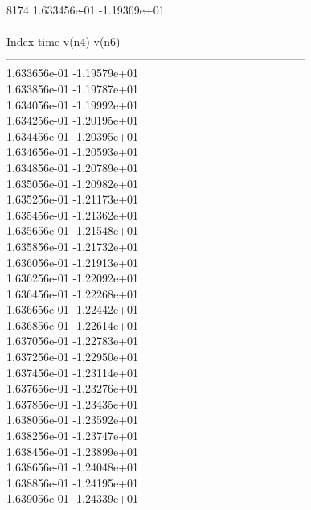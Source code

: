 8174	1.633456e-01	-1.19369e+01	\\ \hline
\\ \hline
Index   time            v(n4)-v(n6)     \\ \hline
--------------------------------------------------------------------------------\\ 	1.633656e-01	-1.19579e+01	\\ 	1.633856e-01	-1.19787e+01	\\ 	1.634056e-01	-1.19992e+01	\\ 	1.634256e-01	-1.20195e+01	\\ 	1.634456e-01	-1.20395e+01	\\ 	1.634656e-01	-1.20593e+01	\\ 	1.634856e-01	-1.20789e+01	\\ 	1.635056e-01	-1.20982e+01	\\ 	1.635256e-01	-1.21173e+01	\\ 	1.635456e-01	-1.21362e+01	\\ 	1.635656e-01	-1.21548e+01	\\ 	1.635856e-01	-1.21732e+01	\\ 	1.636056e-01	-1.21913e+01	\\ 	1.636256e-01	-1.22092e+01	\\ 	1.636456e-01	-1.22268e+01	\\ 	1.636656e-01	-1.22442e+01	\\ 	1.636856e-01	-1.22614e+01	\\ 	1.637056e-01	-1.22783e+01	\\ 	1.637256e-01	-1.22950e+01	\\ 	1.637456e-01	-1.23114e+01	\\ 	1.637656e-01	-1.23276e+01	\\ 	1.637856e-01	-1.23435e+01	\\ 	1.638056e-01	-1.23592e+01	\\ 	1.638256e-01	-1.23747e+01	\\ 	1.638456e-01	-1.23899e+01	\\ 	1.638656e-01	-1.24048e+01	\\ 	1.638856e-01	-1.24195e+01	\\ 	1.639056e-01	-1.24339e+01	\\ \hline
